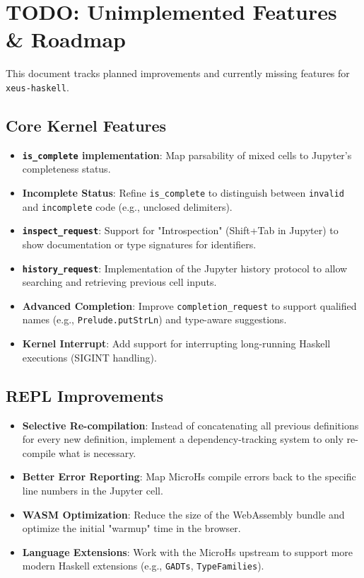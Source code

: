 \section{TODO: Unimplemented Features \& Roadmap}


This document tracks planned improvements and currently missing features for \texttt{xeus-haskell}.
\subsection{Core Kernel Features}


\begin{itemize}
\item [x] \textbf{\texttt{is\_complete} implementation}: Map parsability of mixed cells to Jupyter's completeness status.
\item [ ] \textbf{Incomplete Status}: Refine \texttt{is\_complete} to distinguish between \texttt{invalid} and \texttt{incomplete} code (e.g., unclosed delimiters).
\item [x] \textbf{\texttt{inspect\_request}}: Support for "Introspection" (Shift+Tab in Jupyter) to show documentation or type signatures for identifiers.
\item [ ] \textbf{\texttt{history\_request}}: Implementation of the Jupyter history protocol to allow searching and retrieving previous cell inputs.
\item [ ] \textbf{Advanced Completion}: Improve \texttt{completion\_request} to support qualified names (e.g., \texttt{Prelude.putStrLn}) and type-aware suggestions.
\item [ ] \textbf{Kernel Interrupt}: Add support for interrupting long-running Haskell executions (SIGINT handling).
\end{itemize}


\subsection{REPL Improvements}


\begin{itemize}
\item [ ] \textbf{Selective Re-compilation}: Instead of concatenating all previous definitions for every new definition, implement a dependency-tracking system to only re-compile what is necessary.
\item [ ] \textbf{Better Error Reporting}: Map MicroHs compile errors back to the specific line numbers in the Jupyter cell.
\item [ ] \textbf{WASM Optimization}: Reduce the size of the WebAssembly bundle and optimize the initial "warmup" time in the browser.
\item [x] \textbf{Language Extensions}: Work with the MicroHs upstream to support more modern Haskell extensions (e.g., \texttt{GADTs}, \texttt{TypeFamilies}).
\end{itemize}


